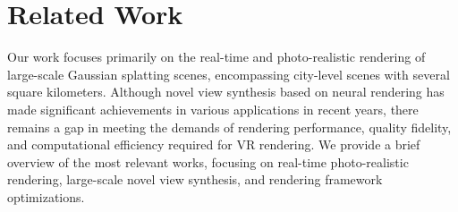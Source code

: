\section{Related Work}

Our work focuses primarily on the real-time and photo-realistic rendering of large-scale Gaussian splatting scenes, encompassing city-level scenes with several square kilometers. Although novel view synthesis based on neural rendering has made significant achievements in various applications in recent years, there remains a gap in meeting the demands of rendering performance, quality fidelity, and computational efficiency required for VR rendering. We provide a brief overview of the most relevant works, focusing on real-time photo-realistic rendering, large-scale novel view synthesis, and rendering framework optimizations.

